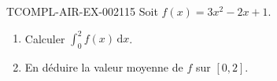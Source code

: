 \begin{exercice}{TCOMPL-AIR-EX-002}{1}{15}
Soit $f(x) = 3x^2-2x+1$.
\begin{enumerate}
  \item Calculer $\displaystyle\int_0^2 f(x)\,\mathrm{d}x$.
  \item En déduire la valeur moyenne de $f$ sur $[0,2]$.
\end{enumerate}
\end{exercice}
